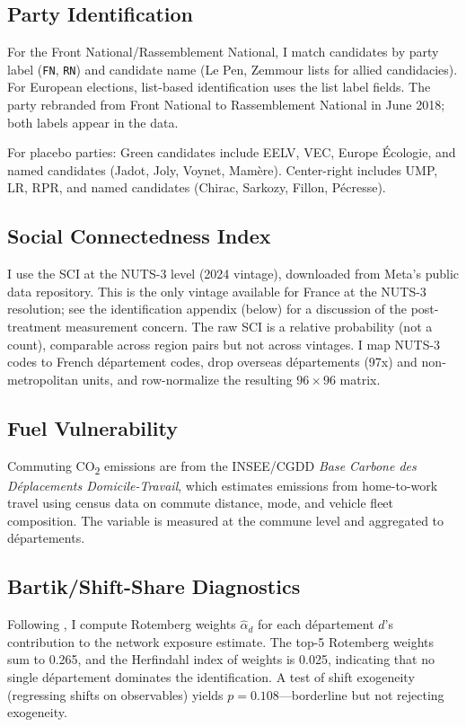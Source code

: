 \documentclass[12pt]{article}
\newcommand{\rn}{Rassemblement National}
\newcommand{\fn}{Front National}
\newcommand{\dept}{d\'{e}partement}
\newcommand{\depts}{d\'{e}partements}
\begin{document}
\subsection{Party Identification}

For the \fn{}/\rn{}, I match candidates by party label (\texttt{FN}, \texttt{RN}) and candidate name (Le Pen, Zemmour lists for allied candidacies). For European elections, list-based identification uses the list label fields. The party rebranded from \fn{} to \rn{} in June 2018; both labels appear in the data.

For placebo parties: Green candidates include EELV, VEC, Europe \'{E}cologie, and named candidates (Jadot, Joly, Voynet, Mam\`{e}re). Center-right includes UMP, LR, RPR, and named candidates (Chirac, Sarkozy, Fillon, P\'{e}cresse).

\subsection{Social Connectedness Index}

I use the SCI at the NUTS-3 level (2024 vintage), downloaded from Meta's public data repository. This is the only vintage available for France at the NUTS-3 resolution; see the identification appendix (below) for a discussion of the post-treatment measurement concern. The raw SCI is a relative probability (not a count), comparable across region pairs but not across vintages. I map NUTS-3 codes to French \dept{} codes, drop overseas \depts{} (97x) and non-metropolitan units, and row-normalize the resulting $96 \times 96$ matrix.

\subsection{Fuel Vulnerability}

Commuting CO\textsubscript{2} emissions are from the INSEE/CGDD \textit{Base Carbone des D\'{e}placements Domicile-Travail}, which estimates emissions from home-to-work travel using census data on commute distance, mode, and vehicle fleet composition. The variable is measured at the commune level and aggregated to \depts{}.

\subsection{Bartik/Shift-Share Diagnostics}

Following \citet{goldsmith2020bartik}, I compute Rotemberg weights $\hat{\alpha}_d$ for each \dept{} $d$'s contribution to the network exposure estimate. The top-5 Rotemberg weights sum to 0.265, and the Herfindahl index of weights is 0.025, indicating that no single \dept{} dominates the identification. A test of shift exogeneity (regressing shifts on observables) yields $p = 0.108$---borderline but not rejecting exogeneity.
\end{document}
